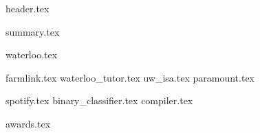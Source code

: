 \documentclass[11pt]{article}
\begin{document}
{header.tex}

{summary.tex}

{waterloo.tex}

{farmlink.tex}
{waterloo_tutor.tex}
{uw_isa.tex}
{paramount.tex}

{spotify.tex}
{binary_classifier.tex}
{compiler.tex}

{awards.tex}
\end{document}
